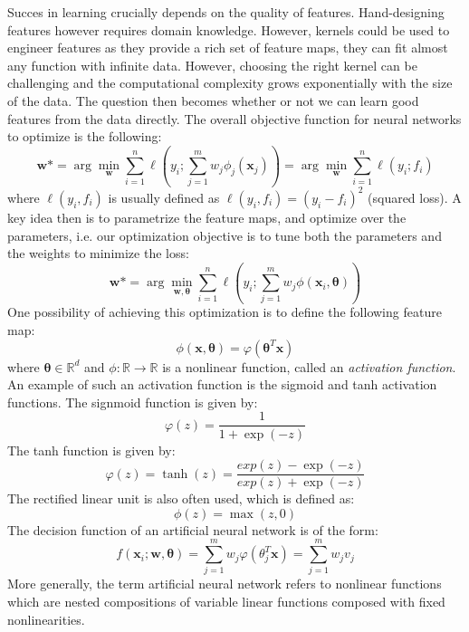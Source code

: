 \documentclass[a4paper,10pt,twoside]{article}
\begin{document}
Succes in learning crucially depends on the quality of features. Hand-designing features however requires domain knowledge. However, kernels could be used to engineer features as they provide a rich set of feature maps, they can fit almost any function with infinite data. However, choosing the right kernel can be challenging and the computational complexity grows exponentially with the size of the data. The question then becomes whether or not we can learn good features from the data directly. The overall objective function for neural networks to optimize is the following:
\begin{equation*}
    \mathbf{w}* =\arg\min_{\mathbf{w}}\sum_{i=1}^{n}\ell(y_i;\sum_{j=1}^{m}w_j\phi_j(\mathbf{x}_j))=\arg\min_{\mathbf{w}}\sum_{i=1}^{n}\ell(y_i;f_i)
\end{equation*}
where $\ell(y_i,f_i)$ is usually defined as $\ell(y_i,f_i)=(y_i-f_i)^2$ (squared loss). A key idea then is to parametrize the feature maps, and optimize over the parameters, i.e. our optimization objective is to tune both the parameters and the weights to minimize the loss:
\begin{equation*}
    \mathbf{w}*=\arg\min_{\mathbf{w},\mathbf{\theta}}\sum_{i=1}^{n}\ell(y_i;\sum_{j=1}^{m}w_j\phi(\mathbf{x}_i,\mathbf{\theta}))
\end{equation*}
One possibility of achieving this optimization is to define the following feature map:
\begin{equation*}
    \phi(\mathbf{x},\mathbf{\theta})=\varphi(\mathbf{\theta}^T\mathbf{x})
\end{equation*}
where $\mathbf{\theta}\in\mathbb{R}^d$ and $\phi:\mathbb{R}\rightarrow\mathbb{R}$ is a nonlinear function, called an \textit{activation function}.
An example of such an activation function is the sigmoid and tanh activation functions. The signmoid function is given by:
\begin{equation*}
    \varphi(z)=\frac{1}{1+\exp(-z)}
\end{equation*}
The tanh function is given by:
\begin{equation*}
    \varphi(z)=\tanh(z)=\frac{exp(z)-\exp(-z)}{exp(z)+\exp(-z)}
\end{equation*}
The rectified linear unit is also often used, which is defined as:
\begin{equation*}
    \phi(z)=\max(z,0)
\end{equation*}
The decision function of an artificial neural network is of the form:
\begin{equation*}
    f(\mathbf{x}_i; \mathbf{w}, \mathbf{\theta})=\sum_{j=1}^{m}w_j\varphi(\theta^T_j\mathbf{x})=\sum_{j=1}^{m}w_jv_j
\end{equation*}
More generally, the term artificial neural network refers to nonlinear functions which are nested compositions of variable linear functions composed with fixed nonlinearities.
\end{document}
